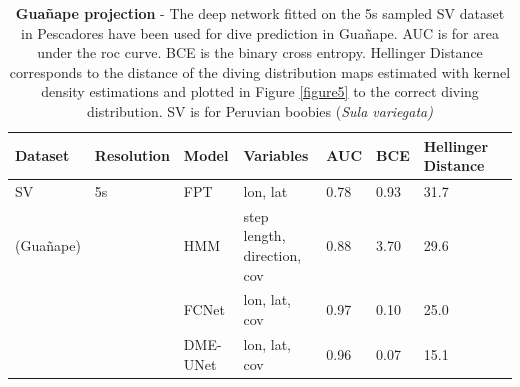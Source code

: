 \documentclass{article}
\begin{document}
\begin{table}[h]
 \caption{\textbf{Gua\~nape projection} - The deep network fitted on the 5s sampled SV dataset in Pescadores have been used for dive prediction in Gua\~nape. AUC is for area under the roc curve. BCE is the binary cross entropy. Hellinger Distance corresponds to the distance of the diving distribution maps estimated with kernel density estimations and plotted in Figure \ref{figure5} to the correct diving distribution. SV is for Peruvian boobies (\textit{Sula variegata)}}
  \centering
  \begin{tabular}{llllllll}
    \toprule
    Dataset  &  Resolution &  Model & Variables & AUC & BCE & Hellinger Distance \\
    \midrule
    SV      & 5s  & FPT    & lon, lat               & 0.78 & 0.93 & 31.7          \\
  (Gua\~nape) &     & HMM    & step length, direction, cov & 0.88 & 3.70 & 29.6     \\
            &     & FCNet  & lon, lat, cov  & 0.97 & 0.10 & 25.0                  \\
            &     & DME-UNet   & lon, lat, cov  & 0.96 & 0.07 & 15.1              \\
    \bottomrule
  \end{tabular}
  \label{table3}
\end{table}
\end{document}
